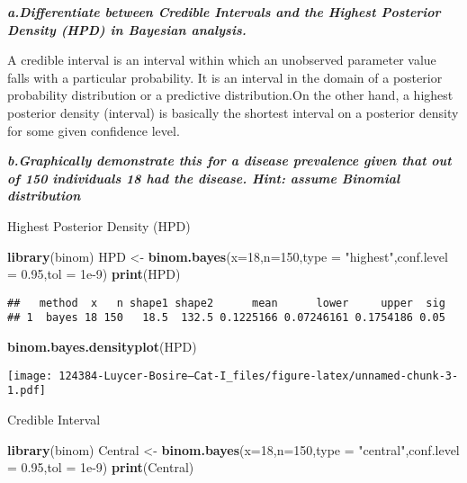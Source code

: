 \documentclass[
]{article}
\newenvironment{Shaded}{\begin{snugshade}}{\end{snugshade}}
\newcommand{\DataTypeTok}[1]{\textcolor[rgb]{0.13,0.29,0.53}{#1}}
\newcommand{\DecValTok}[1]{\textcolor[rgb]{0.00,0.00,0.81}{#1}}
\newcommand{\FloatTok}[1]{\textcolor[rgb]{0.00,0.00,0.81}{#1}}
\newcommand{\KeywordTok}[1]{\textcolor[rgb]{0.13,0.29,0.53}{\textbf{#1}}}
\newcommand{\NormalTok}[1]{#1}
\newcommand{\StringTok}[1]{\textcolor[rgb]{0.31,0.60,0.02}{#1}}
\begin{document}
\textbf{\emph{a.Differentiate between Credible Intervals and the Highest
Posterior Density (HPD) in Bayesian analysis.}}

A credible interval is an interval within which an unobserved parameter
value falls with a particular probability. It is an interval in the
domain of a posterior probability distribution or a predictive
distribution.On the other hand, a highest posterior density (interval)
is basically the shortest interval on a posterior density for some given
confidence level.

\textbf{\emph{b.Graphically demonstrate this for a disease prevalence
given that out of 150 individuals 18 had the disease. Hint: assume
Binomial distribution}}

Highest Posterior Density (HPD)

\begin{Shaded}
\begin{Highlighting}[]
\KeywordTok{library}\NormalTok{(binom)}
\NormalTok{HPD <-}\StringTok{ }\KeywordTok{binom.bayes}\NormalTok{(}\DataTypeTok{x=}\DecValTok{18}\NormalTok{,}\DataTypeTok{n=}\DecValTok{150}\NormalTok{,}\DataTypeTok{type =} \StringTok{"highest"}\NormalTok{,}\DataTypeTok{conf.level =} \FloatTok{0.95}\NormalTok{,}\DataTypeTok{tol =} \FloatTok{1e-9}\NormalTok{)}
\KeywordTok{print}\NormalTok{(HPD)}
\end{Highlighting}
\end{Shaded}

\begin{verbatim}
##   method  x   n shape1 shape2      mean      lower     upper  sig
## 1  bayes 18 150   18.5  132.5 0.1225166 0.07246161 0.1754186 0.05
\end{verbatim}

\begin{Shaded}
\begin{Highlighting}[]
\KeywordTok{binom.bayes.densityplot}\NormalTok{(HPD)}
\end{Highlighting}
\end{Shaded}

\texttt{[image: 124384-Luycer-Bosire---Cat-I\_files/figure-latex/unnamed-chunk-3-1.pdf]}

Credible Interval

\begin{Shaded}
\begin{Highlighting}[]
\KeywordTok{library}\NormalTok{(binom)}
\NormalTok{Central <-}\StringTok{ }\KeywordTok{binom.bayes}\NormalTok{(}\DataTypeTok{x=}\DecValTok{18}\NormalTok{,}\DataTypeTok{n=}\DecValTok{150}\NormalTok{,}\DataTypeTok{type =} \StringTok{"central"}\NormalTok{,}\DataTypeTok{conf.level =} \FloatTok{0.95}\NormalTok{,}\DataTypeTok{tol =} \FloatTok{1e-9}\NormalTok{)}
\KeywordTok{print}\NormalTok{(Central)}
\end{Highlighting}
\end{Shaded}
\end{document}
